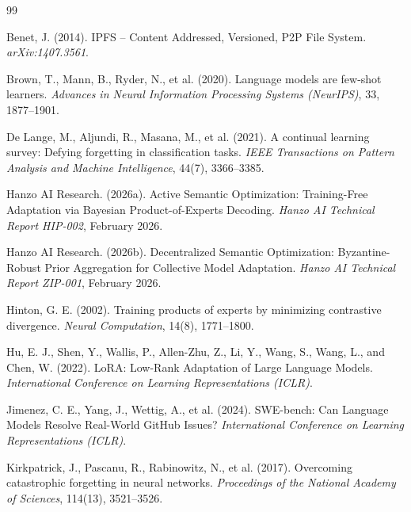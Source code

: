 
\begin{thebibliography}{99}

Benet, J. (2014).
\newblock IPFS -- Content Addressed, Versioned, P2P File System.
\newblock \emph{arXiv:1407.3561}.

Brown, T., Mann, B., Ryder, N., et al. (2020).
\newblock Language models are few-shot learners.
\newblock \emph{Advances in Neural Information Processing Systems (NeurIPS)}, 33, 1877--1901.

De Lange, M., Aljundi, R., Masana, M., et al. (2021).
\newblock A continual learning survey: Defying forgetting in classification tasks.
\newblock \emph{IEEE Transactions on Pattern Analysis and Machine Intelligence}, 44(7), 3366--3385.

Hanzo AI Research. (2026a).
\newblock Active Semantic Optimization: Training-Free Adaptation via Bayesian
  Product-of-Experts Decoding.
\newblock \emph{Hanzo AI Technical Report HIP-002}, February 2026.

Hanzo AI Research. (2026b).
\newblock Decentralized Semantic Optimization: Byzantine-Robust Prior
  Aggregation for Collective Model Adaptation.
\newblock \emph{Hanzo AI Technical Report ZIP-001}, February 2026.

Hinton, G. E. (2002).
\newblock Training products of experts by minimizing contrastive divergence.
\newblock \emph{Neural Computation}, 14(8), 1771--1800.

Hu, E. J., Shen, Y., Wallis, P., Allen-Zhu, Z., Li, Y., Wang, S., Wang, L., and Chen, W. (2022).
\newblock LoRA: Low-Rank Adaptation of Large Language Models.
\newblock \emph{International Conference on Learning Representations (ICLR)}.

Jimenez, C. E., Yang, J., Wettig, A., et al. (2024).
\newblock SWE-bench: Can Language Models Resolve Real-World GitHub Issues?
\newblock \emph{International Conference on Learning Representations (ICLR)}.

Kirkpatrick, J., Pascanu, R., Rabinowitz, N., et al. (2017).
\newblock Overcoming catastrophic forgetting in neural networks.
\newblock \emph{Proceedings of the National Academy of Sciences}, 114(13), 3521--3526.


\end{thebibliography}
